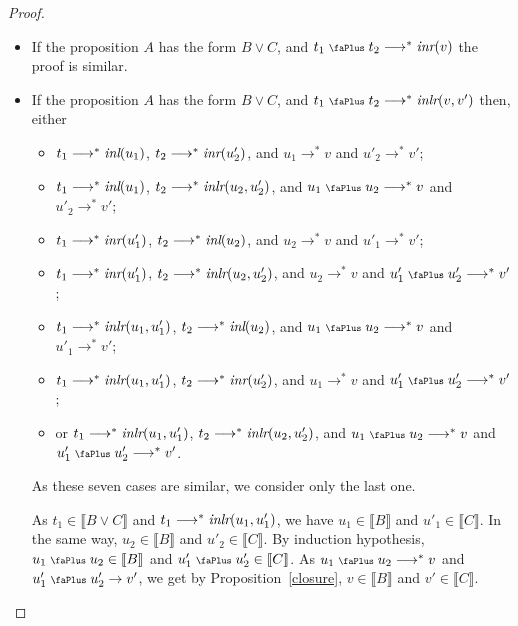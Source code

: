 \documentclass[screen, sigconf,authorversion,nonacm]{acmart}
\theoremstyle{acmdefinition}
\numberwithin{equation}{section}
\newcommand\inl{\mbox{\it inl}}
\newcommand\inr{\mbox{\it inr}}
\newcommand\inlr{\mbox{\it inlr}}
\newcommand\plus{\mathrel{\text{\normalfont\scalebox{0.7}{\faPlus}}}}
\newcommand\lra{\longrightarrow}
\begin{document}
\begin{proof}
\begin{itemize}
\item If the proposition $A$ has the form $B \vee C$, and $t_1 \plus
  t_2 \lra^* \inr(v)$ the proof is similar.

\item
    If the proposition $A$ has the form $B \vee C$, and $t_1 \plus
    t_2 \lra^* \inlr(v,v')$ then, either
    \begin{itemize}
      \item
	$t_1 \lra^* \inl(u_1)$, $t_2 \lra^* \inr(u'_2)$, and
	$u_1 \lra^* v$ and  $u'_2 \lra^* v'$;

      \item
	$t_1 \lra^* \inl(u_1)$, $t_2 \lra^* \inlr(u_2,u'_2)$, and
	$u_1 \plus u_2 \lra^* v$ and  $u'_2 \lra^* v'$;

      \item
	$t_1 \lra^* \inr(u'_1)$, $t_2 \lra^* \inl(u_2)$, and
	$u_2 \lra^* v$ and  $u'_1 \lra^* v'$;

      \item
	$t_1 \lra^* \inr(u'_1)$, $t_2 \lra^* \inlr(u_2,u'_2)$, and
	$u_2 \lra^* v$ and  $u'_1 \plus u'_2 \lra^* v'$;

      \item
	$t_1 \lra^* \inlr(u_1,u'_1)$, $t_2 \lra^* \inl(u_2)$, and
	$u_1 \plus u_2 \lra^* v$ and  $u'_1 \lra^* v'$;

      \item
	$t_1 \lra^* \inlr(u_1,u'_1)$, $t_2 \lra^* \inr(u'_2)$, and
	$u_1 \lra^* v$ and  $u'_1 \plus u'_2 \lra^* v'$;


      \item
	or $t_1 \lra^* \inlr(u_1,u'_1)$, $t_2 \lra^* \inlr(u_2,u'_2)$, and
	$u_1 \plus u_2 \lra^* v$ and  $u'_1 \plus u'_2 \lra^* v'$.
    \end{itemize}

    As these seven cases are similar, we consider only the last one.

    As $t_1 \in \llbracket B \vee C \rrbracket$ and $t_1 \lra^*
    \inlr(u_1,u'_1)$, we have 
    $u_1 \in \llbracket B \rrbracket$
    and
    $u'_1 \in \llbracket C \rrbracket$.
    In the same way, 
    $u_2 \in \llbracket B \rrbracket$
    and
    $u'_2 \in \llbracket C \rrbracket$.
    By induction hypothesis,
    $u_1 \plus u_2 \in \llbracket B \rrbracket$
    and
    $u'_1 \plus u'_2 \in \llbracket C \rrbracket$.
    As $u_1 \plus u_2 \lra^* v$ and $u'_1\plus u'_2\to v'$,
    we get by  Proposition~\ref{closure}, 
    $v \in \llbracket B \rrbracket$ and
    $v' \in \llbracket C \rrbracket$.
    \qedhere
\end{itemize}
\end{proof}
\end{document}
